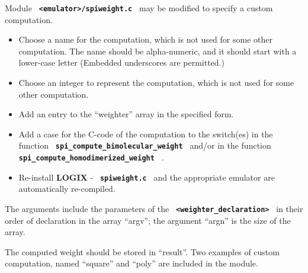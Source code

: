 \documentclass[twoside,10pt]{report}
\begin{document}
\noindent
Module {\bf \verb+ <emulator>/spiweight.c +} may be modified to
specify a custom computation.

\begin{itemize}
\item Choose a name for the computation, which is not used for some
other computation.  The name should be
alpha-numeric, and it should start with a lower-case letter (Embedded
underscores are permitted.)
\item Choose an integer to represent the computation, which is not used for
some other computation.
\item Add an entry to the ``weighter'' array in the specified form.
\item Add a case for the C-code of the computation to the switch(es)
in the function
{\bf \verb+ spi_compute_bimolecular_weight +} and/or in the function
\newline
{\bf \verb+ spi_compute_homodimerized_weight +} .
\item Re-install {\bf LOGIX} - {\bf \verb+ spiweight.c +} and the
appropriate emulator are automatically re-compiled.
\end{itemize}

\noindent
The arguments include the parameters of the
{\bf \verb+ <weighter_declaration> +} in their order of declaration in
the array ``argv''; the argument ``argn'' is the size of the
array.

\noindent
The computed weight should be stored in ``result''.  Two
examples of custom computation, named ``square'' and ``poly''
are included in the module.

\newpage



\end{document}
